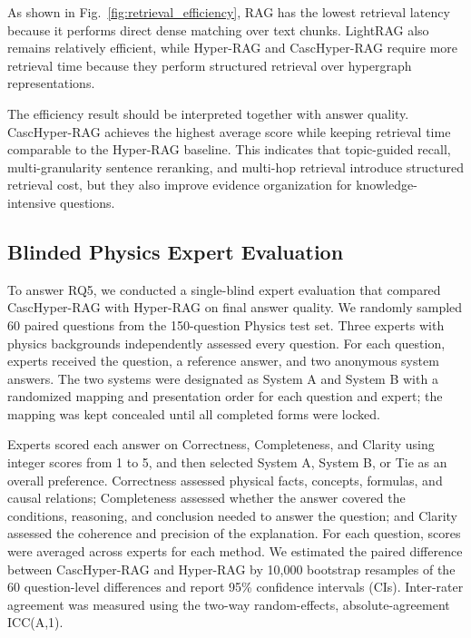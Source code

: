 \documentclass[a4paper,fleqn]{cas-dc}
\begin{document}
As shown in Fig.~\ref{fig:retrieval_efficiency}, RAG has the lowest retrieval latency because it performs direct dense matching over text chunks. LightRAG also remains relatively efficient, while Hyper-RAG and CascHyper-RAG require more retrieval time because they perform structured retrieval over  hypergraph representations.

The efficiency result should be interpreted together with answer quality. CascHyper-RAG achieves the highest average score while keeping retrieval time comparable to the Hyper-RAG baseline. This indicates that topic-guided recall, multi-granularity sentence reranking, and multi-hop retrieval introduce structured retrieval cost, but they also improve evidence organization for knowledge-intensive questions.

\subsection{Blinded Physics Expert Evaluation}

To answer RQ5, we conducted a single-blind expert evaluation that compared CascHyper-RAG with Hyper-RAG on final answer quality. We randomly sampled 60 paired questions from the 150-question Physics test set. Three experts with physics backgrounds independently assessed every question. For each question, experts received the question, a reference answer, and two anonymous system answers. The two systems were designated as System A and System B with a randomized mapping and presentation order for each question and expert; the mapping was kept concealed until all completed forms were locked.

Experts scored each answer on Correctness, Completeness, and Clarity using integer scores from 1 to 5, and then selected System A, System B, or Tie as an overall preference. Correctness assessed physical facts, concepts, formulas, and causal relations; Completeness assessed whether the answer covered the conditions, reasoning, and conclusion needed to answer the question; and Clarity assessed the coherence and precision of the explanation. For each question, scores were averaged across experts for each method. We estimated the paired difference between CascHyper-RAG and Hyper-RAG by 10,000 bootstrap resamples of the 60 question-level differences and report 95\% confidence intervals (CIs). Inter-rater agreement was measured using the two-way random-effects, absolute-agreement ICC(A,1).
\end{document}
